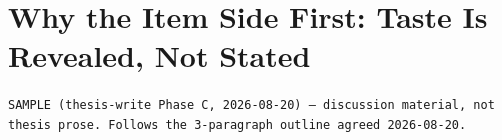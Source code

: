 \documentclass[11pt,a4paper]{article}
\begin{document}
\section*{Why the Item Side First: Taste Is Revealed, Not Stated}
{\scriptsize\color{gray}\texttt{SAMPLE (thesis-write Phase C, 2026-08-20) — discussion material, not thesis prose. Follows the 3-paragraph outline agreed 2026-08-20.}\par}
\vspace{1em}
\makeatletter
\newcommand{\swallowsection}[1]{}
\makeatother


\end{document}
